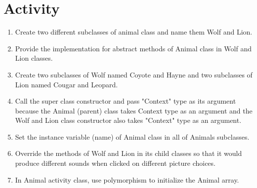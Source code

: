 \section{Activity}

\begin{enumerate}
	

\item Create two different subclasses of animal class and name them Wolf and Lion.

\item Provide the implementation for abstract methods of Animal class in Wolf and Lion classes.
	
\item Create two subclasses of Wolf named Coyote and Hayne and two subclasses of Lion named Cougar and Leopard.
	
\item Call the super class constructor and pass "Context" type as its argument because the Animal (parent) class takes Context type as an argument 	   and the Wolf and Lion class constructor also takes "Context" type as an argument.

\item Set the instance variable (name) of Animal class in all of Animals subclasses.

\item Override the methods of Wolf and Lion in its child classes so that it would produce different sounds when clicked on different picture 	     choices.

\item In Animal activity class, use polymorphism to initialize the Animal array.

\end{enumerate}


